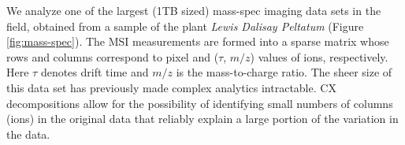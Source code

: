 We analyze one of the largest (1TB sized) mass-spec imaging data sets in the field, obtained from a sample of the plant {\it Lewis Dalisay Peltatum} (Figure \ref{fig:mass-spec}). The MSI measurements are formed into a sparse matrix whose rows and columns correspond to pixel and ($\tau$, $m/z$) values of ions, respectively. Here $\tau$ denotes drift time and $m/z$ is the mass-to-charge ratio. The sheer size of this data set has previously made complex analytics intractable. CX decompositions allow for the possibility of identifying small numbers of columns (ions) in the original data that reliably explain a large portion of the variation in the data.


